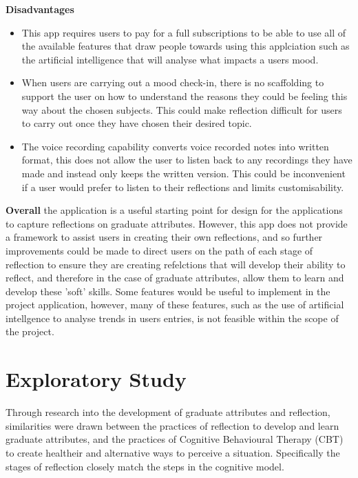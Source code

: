 \documentclass{l4proj}
\begin{document}
\textbf{Disadvantages}
\begin{itemize}
    \item This app requires users to pay for a full subscriptions to be able to use all of the available features that draw people towards using this applciation
    such as the artificial intelligence that will analyse what impacts a users mood. 
    \item When users are carrying out a mood check-in, there is no scaffolding to support the user on how to understand the reasons they could be feeling 
    this way about the chosen subjects. This could make reflection difficult for users to carry out once they have chosen their desired topic.
    \item The voice recording capability converts voice recorded notes into written format, this does not allow the user to listen back to any recordings they 
    have made and instead only keeps the written version. This could be inconvenient if a user would prefer to listen to their reflections and limits customisability.
\end{itemize}

\textbf{Overall} the application is a useful starting point for design for the applications to capture reflections on graduate attributes. However, this app
does not provide a framework to assist users in creating their own reflections, and so further improvements could be made to direct users on the path
of each stage of reflection to ensure they are creating refelctions that will develop their ability to reflect, and therefore in the case of graduate attributes,
allow them to learn and develop these 'soft' skills. Some features would
be useful to implement in the project application, however, many of these features, such as the use of artificial intellgence to analyse trends in users
entries, is not feasible within the scope of the project.

\chapter{Exploratory Study} \label{ExploratoryStudy}

Through research into the development of graduate attributes and reflection, similarities were drawn between the practices of reflection to develop and learn graduate attributes, and the practices of Cognitive Behavioural Therapy (CBT) to create healtheir and alternative ways to perceive a situation. Specifically the stages of reflection closely match the steps in the cognitive model. 
\end{document}
